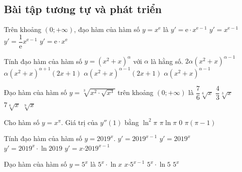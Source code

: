 \subsection{Bài tập tương tự và phát triển}
\begin{ex}%
	Trên khoảng $(0; +\infty)$, đạo hàm của hàm số $y=x^\mathrm{e}$ là
	\choice
	{\True $y'=\mathrm{e} \cdot x^{\mathrm{e}-1}$}
	{$y'=x^{\mathrm{e}-1}$}
	{$y'=\dfrac{1}{\mathrm{e}} x^{\mathrm{e}-1}$}
	{$y'=\mathrm{e} \cdot x^\mathrm{e}$}
\end{ex}
\begin{ex}%
	Tính đạo hàm của hàm số $y=\left(x^2+x\right)^\alpha$ với $\alpha$ là hằng số.
	\choice
	{$2\alpha\left(x^2+x\right)^{\alpha-1}$}
	{$\alpha\left(x^2+x\right)^{\alpha+1}\left(2x+1\right)$}
	{\True $\alpha\left(x^2+x\right)^{\alpha-1}\left(2x+1\right)$}
	{$\alpha\left(x^2+x\right)^{\alpha-1}$}
\end{ex}
\begin{ex}%
	Đạo hàm của hàm số $y=\sqrt[3]{x^2\cdot\sqrt{x^3}}$ trên khoảng $\left(0;+\infty\right)$ là
	\choice
	{\True $\dfrac{7}{6}\sqrt[6]{x}$}
	{$\dfrac{4}{3}\sqrt[3]{x}$}
	{$7\sqrt[6]{x}$}
	{$\sqrt[9]{x}$}
\end{ex}
\begin{ex}%
	Cho hàm số $y=x^\pi$. Giá trị của $y''\left(1\right)$ bằng
	\choice
	{$\ln ^2\pi$}
	{$\pi\ln \pi$}
	{$0$}
	{\True $\pi\left(\pi-1\right)$}
\end{ex}

\begin{ex}%
	Tính đạo hàm của hàm số $ y={{2019}^x}$.
	\choice
	{ $y'={{2019}^{x-1}}$}
	{ $y'={{2019}^x}$}
	{\True $y'={{2019}^x}\cdot \ln 2019$}
	{ $y'=x{{\cdot 2019}^{x-1}}$}
\end{ex}
\begin{ex}%
	Đạo hàm của hàm số $ y={5^x}$ là
	\choice
	{ ${5^x}\cdot \ln x$}
	{ $ x{{\cdot 5}^{x-1}}$}
	{\True ${5^x}\cdot \ln 5$}
	{ ${5^x}$}
\end{ex}

